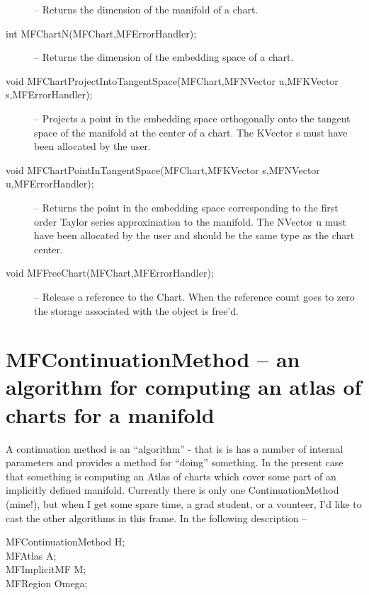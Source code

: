 \documentclass[12pt]{article}
\begin{document}
\begin{description}
-- Returns the dimension of the manifold of a chart.
\item [int MFChartN(MFChart,MFErrorHandler);]
-- Returns the dimension of the embedding space of a chart.
\item [void MFChartProjectIntoTangentSpace(MFChart,MFNVector u,MFKVector s,MFErrorHandler);]
-- Projects a point in the embedding space orthogonally onto the tangent space of the manifold
at the center of a chart. The KVector {s} must have been allocated by the user.
\item [void MFChartPointInTangentSpace(MFChart,MFKVector s,MFNVector u,MFErrorHandler);]
-- Returns the point in the embedding space corresponding to the first order Taylor series approximation
to the manifold.
The NVector {u} must have been allocated by the user and should be the same type as the chart center.
\item [void MFFreeChart(MFChart,MFErrorHandler);]
-- Release a reference to the Chart. When the reference count goes to zero the
   storage associated with the object is free'd.
\end{description}

\section{MFContinuationMethod -- an algorithm for computing an atlas of charts for a manifold}

A continuation method is an ``algorithm'' - that is is has a number of internal parameters and
provides a method for ``doing'' something. In the present case that something is computing an
Atlas of charts which cover some part of an implicitly defined manifold. Currently there is only one
ContinuationMethod (mine!), but when I get some spare time, a grad student, or a vounteer, I'd
like to cast the other algorithms in this frame.
In the following description --
\begin{description}
\item [MFContinuationMethod H;]
\item [MFAtlas A;]
\item [MFImplicitMF M;]
\item [MFRegion Omega;]
\end{description}
\end{document}
